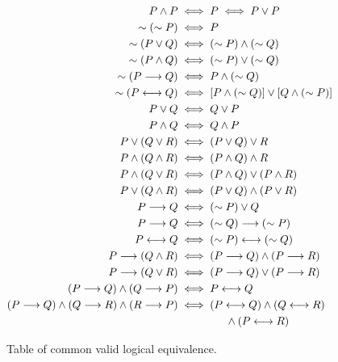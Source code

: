 \begin{table}
\begin{align}
P\wedge P&\iff P\iff P\vee P\qquad\qquad
\label{Idempotents}\\
\sim(\sim P)&\iff P\label{NotNotP<->P}\\
\sim(P\vee Q)&\iff(\sim P)\wedge(\sim Q)\label{SimPVeeQ}\\
\sim(P\wedge Q)&\iff(\sim P)\vee(\sim Q)\label{SimPWedgeQ}\\
\sim(P\longrightarrow Q)&\iff P\wedge(\sim Q)\label{not(P->Q)}\\
\sim(P\longleftrightarrow Q)&\iff
[P\wedge(\sim Q)]\vee[Q\wedge(\sim P)]\label{not(P<->Q}\\
P\vee Q&\iff Q\vee P\label{PVQ<->QVP}\\ 
P\wedge Q&\iff Q\wedge P\\
P\vee(Q\vee R)&\iff (P\vee Q)\vee R\label{veeovervee}\\
P\wedge(Q\wedge R)&\iff (P\wedge Q)\wedge R\label{wedgeoverwedge}\\
P\wedge(Q\vee R)&\iff (P\wedge Q)\vee(P\wedge R)\label{LogicDistrib1}\\
P\vee(Q\wedge R)&\iff (P\vee Q)\wedge(P\vee R)\label{LogicDistrib2}\\
P\longrightarrow Q&\iff(\sim P)\vee Q\label{AltP->Q}\\
P\longrightarrow Q&\iff(\sim Q)\longrightarrow(\sim P)\label{contrap}\\
P\longleftrightarrow Q&\iff(\sim P)\longleftrightarrow(\sim Q)
            \label{BiImpSameAsBiImpOnNegs}\\
P\longrightarrow(Q\wedge R)&\iff(P\longrightarrow Q)\wedge
         (P\longrightarrow R)\label{P->QANDR}\\
P\longrightarrow(Q\vee R)&\iff(P\longrightarrow Q)\vee
         (P\longrightarrow R)\label{P->QORR}\\
(P\longrightarrow Q)\wedge(Q\longrightarrow
P)&\iff P\longleftrightarrow Q\label{2cycleequiv}\\
(P\longrightarrow Q)\wedge(Q\longrightarrow R)\wedge(R\longrightarrow P)
&\iff (P\longleftrightarrow Q)\wedge(Q\longleftrightarrow R)
   \notag\qquad\qquad\qquad\qquad\\
&\hphantom{\iff} \qquad\wedge(P\longleftrightarrow R)
\label{3cycleequiv}
\end{align} 
\caption{Table of common valid logical equivalence.}
\label{TableOfCommonValidEquivalences}
\end{table}


